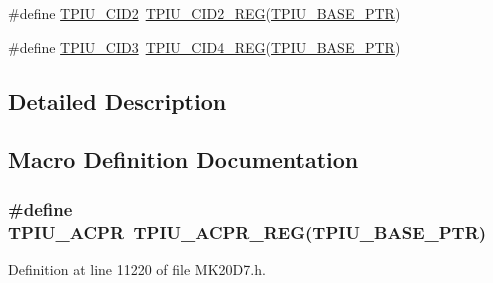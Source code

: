 \begin{DoxyCompactItemize}
\#define \hyperlink{group___t_p_i_u___register___accessor___macros_ga6dcaf432d12b9c73b2db40c0b06eaa77}{T\+P\+I\+U\+\_\+\+C\+I\+D2}~\hyperlink{group___t_p_i_u___register___accessor___macros_ga5a60a1d412839185c0398f0b29153430}{T\+P\+I\+U\+\_\+\+C\+I\+D2\+\_\+\+R\+EG}(\hyperlink{group___t_p_i_u___peripheral_ga9294dc3ec1881014ac83408db60de6a0}{T\+P\+I\+U\+\_\+\+B\+A\+S\+E\+\_\+\+P\+TR})
\item 
\#define \hyperlink{group___t_p_i_u___register___accessor___macros_ga73504328272607fbb53054442b6d4bb8}{T\+P\+I\+U\+\_\+\+C\+I\+D3}~\hyperlink{group___t_p_i_u___register___accessor___macros_ga887058c50d4ad4cfce8fefc4275e9dc2}{T\+P\+I\+U\+\_\+\+C\+I\+D4\+\_\+\+R\+EG}(\hyperlink{group___t_p_i_u___peripheral_ga9294dc3ec1881014ac83408db60de6a0}{T\+P\+I\+U\+\_\+\+B\+A\+S\+E\+\_\+\+P\+TR})
\end{DoxyCompactItemize}


\subsection{Detailed Description}


\subsection{Macro Definition Documentation}
\subsubsection[{\texorpdfstring{T\+P\+I\+U\+\_\+\+A\+C\+PR}{TPIU_ACPR}}]{\setlength{\rightskip}{0pt plus 5cm}\#define T\+P\+I\+U\+\_\+\+A\+C\+PR~{\bf T\+P\+I\+U\+\_\+\+A\+C\+P\+R\+\_\+\+R\+EG}({\bf T\+P\+I\+U\+\_\+\+B\+A\+S\+E\+\_\+\+P\+TR})}\hypertarget{group___t_p_i_u___register___accessor___macros_ga5b928b2763dbc7685675954dfbc77b5e}{}\label{group___t_p_i_u___register___accessor___macros_ga5b928b2763dbc7685675954dfbc77b5e}


Definition at line 11220 of file M\+K20\+D7.\+h.

